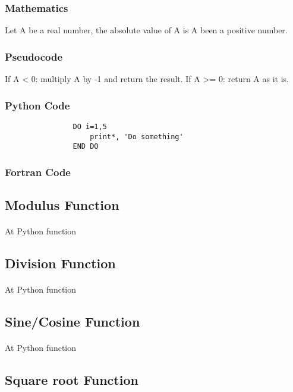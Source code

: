 \documentclass{article}
\begin{document}
			\subsubsection{Mathematics}
			Let A be a real number, the absolute value of A is A been a positive number.
			\subsubsection{Pseudocode}
			If A < 0: multiply A by -1 and return the result.
			If A >= 0: return A as it is.
			\subsubsection{Python Code}
			\begin{verbatim}
				DO i=1,5
					print*, 'Do something'
				END DO
			\end{verbatim}
			\subsubsection{Fortran Code}

		\subsection{Modulus Function}
		\paragraph{}
		At Python function

		\subsection{Division Function} \label{sec:df}
		\paragraph{}
		At Python function

		\subsection{Sine/Cosine Function}
		\paragraph{}
		At Python function

		\subsection{Square root Function}
\end{document}
